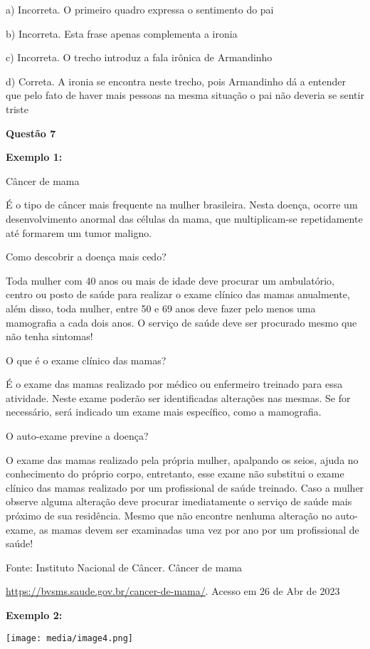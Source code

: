 a) Incorreta. O primeiro quadro expressa o sentimento do pai

b) Incorreta. Esta frase apenas complementa a ironia

c) Incorreta. O trecho introduz a fala irônica de Armandinho

d) Correta. A ironia se encontra neste trecho, pois Armandinho dá a
entender que pelo fato de haver mais pessoas na mesma situação o pai não
deveria se sentir triste

\textbf{Questão 7}

\textbf{Exemplo 1:}

Câncer de mama

É o tipo de câncer mais frequente na mulher brasileira. Nesta doença,
ocorre um desenvolvimento anormal das células da mama, que
multiplicam-se repetidamente até formarem um tumor maligno.

Como descobrir a doença mais cedo?

Toda mulher com 40 anos ou mais de idade deve procurar um ambulatório,
centro ou posto de saúde para realizar o exame clínico das mamas
anualmente, além disso, toda mulher, entre 50 e 69 anos deve fazer pelo
menos uma mamografia a cada dois anos. O serviço de saúde deve ser
procurado mesmo que não tenha sintomas!

O que é o exame clínico das mamas?

É o exame das mamas realizado por médico ou enfermeiro treinado para
essa atividade. Neste exame poderão ser identificadas alterações nas
mesmas. Se for necessário, será indicado um exame mais específico, como
a mamografia.

O auto-exame previne a doença?

O exame das mamas realizado pela própria mulher, apalpando os seios,
ajuda no conhecimento do próprio corpo, entretanto, esse exame não
substitui o exame clínico das mamas realizado por um profissional de
saúde treinado. Caso a mulher observe alguma alteração deve procurar
imediatamente o serviço de saúde mais próximo de sua residência. Mesmo
que não encontre nenhuma alteração no auto-exame, as mamas devem ser
examinadas uma vez por ano por um profissional de saúde!

Fonte: Instituto Nacional de Câncer. Câncer de mama

\href{https://bvsms.saude.gov.br/cancer-de-mama/}{{https://bvsms.saude.gov.br/cancer-de-mama/}}.
Acesso em 26 de Abr de 2023

\textbf{Exemplo 2:}

\texttt{[image: media/image4.png]}

